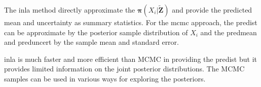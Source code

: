 \documentclass[a4paper,12pt]{article}
\begin{document}
The \acrshort{inla} method directly approximate the $\bm{\pi}(X_i | \bm{\tilde{Z}})$ and provide the predicted mean and uncertainty as summary statistics. For the \acrshort{mcmc} approach, the \gls{predist} can be approximate by the posterior sample distribution of $X_i$ and the \gls{predmean} and \gls{preduncert} by the sample mean and standard error.

\acrshort{inla} is much faster and more efficient than MCMC in providing the \gls{predist} but it provides limited information on the joint posterior distributions. The MCMC samples can be used in various ways for exploring the posteriors.



\clearpage
 
\printglossary[type=\acronymtype]
 
\printglossary
 


\end{document}
